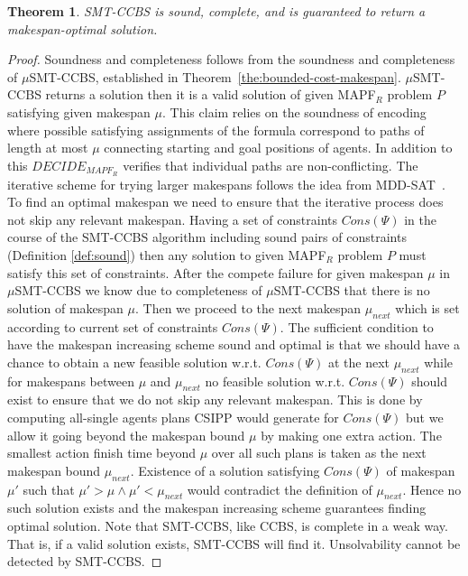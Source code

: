 \documentclass[review]{elsarticle}
\newtheorem{theorem}{Theorem}
\newcommand{\decidemapfr}{\ensuremath{\mathit{DECIDE_{MAPF_R}}}\xspace}
\newcommand\roni[1]{\nb{\textbf{Roni:}}{green}{#1}}
\newcommand\pavel[1]{\nb{\textbf{Pavel:}}{blue}{#1}}
\newcommand{\ccbs}{\ac{CCBS}\xspace}
\newcommand{\mapfr}{\ac{MAPF}$_R$\xspace}
\newcommand{\mddsat}{MDD-SAT\xspace}
\newcommand{\smtccbs}{SMT-CCBS\xspace}
\newcommand{\musmtccbs}{\ensuremath{\mu}SMT-CCBS\xspace}
\begin{document}
\begin{theorem}
\smtccbs is sound, complete, and is guaranteed to return a makespan-optimal solution. 
\label{the:optimal-makespan}
\end{theorem}
\begin{proof}
Soundness and completeness follows from the soundness and completeness of \musmtccbs, established in Theorem~\ref{the:bounded-cost-makespan}. 
\musmtccbs returns a solution then it is a valid solution of given \mapfr problem $P$ satisfying given makespan $\mu$. This claim relies on the soundness of encoding where possible satisfying assignments of the formula correspond to paths of length at most $\mu$ connecting starting and goal positions of agents. In addition to this \decidemapfr verifies that individual paths are non-conflicting.
The iterative scheme for trying larger makespans follows the idea from \mddsat~\cite{DBLP:conf/ecai/SurynekFSB16}. To find an optimal makespan we need to ensure that the iterative process does not skip any relevant makespan. Having a set of constraints $Cons(\Psi)$ in the course of the \smtccbs algorithm including sound pairs of constraints (Definition \ref{def:sound}) then any solution to given \mapfr problem $P$ must satisfy this set of constraints. After the compete failure for given makespan $\mu$ in $\mu$\smtccbs we know due to completeness of $\mu$\smtccbs that there is no solution of makespan $\mu$. Then we proceed to the next makespan $\mu_{next}$ which is set according to current set of constraints $Cons(\Psi)$.
The sufficient condition to have the makespan increasing scheme sound and optimal is that we should have a chance to obtain a new feasible solution w.r.t. $Cons(\Psi)$ at the next $\mu_{next}$ while for makespans between $\mu$ and $\mu_{next}$ no feasible solution w.r.t. $Cons(\Psi)$ should exist to ensure that we do not skip any relevant makespan. This is done by computing all-single agents plans CSIPP would generate for $Cons(\Psi)$ but we allow it going beyond the makespan bound $\mu$ by making one extra action. The smallest action finish time beyond $\mu$ over all such plans is taken as the next makespan bound $\mu_{next}$. Existence of a solution satisfying $Cons(\Psi)$ of makespan $\mu'$ such that $\mu' > \mu \wedge \mu' < \mu_{next}$ would contradict the definition of $\mu_{next}$. Hence no such solution exists and the makespan increasing scheme guarantees finding optimal solution. %
Note that \smtccbs, like \ccbs, is complete in a weak way. That is, if a valid solution exists, \smtccbs will find it. Unsolvability cannot be detected by \smtccbs.
\end{proof}
\end{document}
